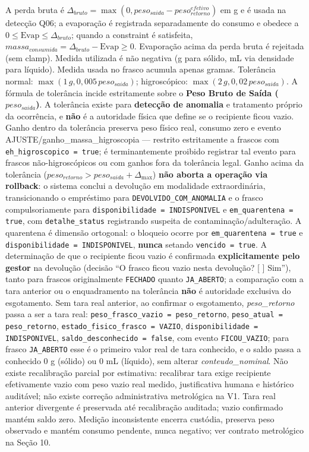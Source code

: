 \begin{regra}
A perda bruta é $\Delta_{bruto}=\max(0, peso_{saida}-peso_{retorno}^{efetivo})$ em g e é usada na detecção Q06; a evaporação é registrada separadamente do consumo e obedece a $0 \le \text{Evap} \le \Delta_{bruto}$; quando a constraint é satisfeita, $massa_{consumida}=\Delta_{bruto}-\text{Evap} \ge 0$. Evaporação acima da perda bruta é rejeitada (sem clamp). Medida utilizada é não negativa (g para sólido, mL via densidade para líquido). Medida usada no frasco acumula apenas gramas. Tolerância normal: $\max(1\,g,0{,}005\,peso_{saida})$; higroscópico: $\max(2\,g,0{,}02\,peso_{saida})$. A fórmula de tolerância incide estritamente sobre o \textbf{Peso Bruto de Saída ($peso_{saida}$)}. A tolerância existe para \textbf{detecção de anomalia} e tratamento próprio da ocorrência, e \textbf{não} é a autoridade física que define se o recipiente ficou vazio. Ganho dentro da tolerância preserva peso físico real, consumo zero e evento AJUSTE/ganho\_massa\_higroscopia --- restrito estritamente a frascos com \texttt{eh\_higroscopico = true}; é terminantemente proibido registrar tal evento para frascos não-higroscópicos ou com ganhos fora da tolerância legal. Ganho acima da tolerância ($peso_{retorno} > peso_{saida} + \Delta_{\max}$) \textbf{não aborta a operação via rollback}: o sistema conclui a devolução em modalidade extraordinária, transicionando o empréstimo para \texttt{DEVOLVIDO\_COM\_ANOMALIA} e o frasco compulsoriamente para \texttt{disponibilidade = INDISPONIVEL} e \texttt{em\_quarentena = true}, com \texttt{detalhe\_status} registrando suspeita de contaminação/adulteração. A quarentena é dimensão ortogonal: o bloqueio ocorre por \texttt{em\_quarentena = true} e \texttt{disponibilidade = INDISPONIVEL}, \textbf{nunca} setando \texttt{vencido = true}. A determinação de que o recipiente ficou vazio é confirmada \textbf{explicitamente pelo gestor} na devolução (decisão ``O frasco ficou vazio nesta devolução? [ ] Sim''), tanto para frascos originalmente \texttt{FECHADO} quanto \texttt{JA\_ABERTO}; a comparação com a tara anterior ou o enquadramento na tolerância \textbf{não} é autoridade exclusiva do esgotamento. Sem tara real anterior, ao confirmar o esgotamento, \textit{peso\_retorno} passa a ser a tara real: \texttt{peso\_frasco\_vazio = peso\_retorno}, \texttt{peso\_atual = peso\_retorno}, \texttt{estado\_fisico\_frasco = VAZIO}, \texttt{disponibilidade = INDISPONIVEL}, \texttt{saldo\_desconhecido = false}, com evento \texttt{FICOU\_VAZIO}; para frasco \texttt{JA\_ABERTO} esse é o primeiro valor real de tara conhecido, e o saldo passa a conhecido 0 g (sólido) ou 0 mL (líquido), sem alterar \textit{conteudo\_nominal}. Não existe recalibração parcial por estimativa: recalibrar tara exige recipiente efetivamente vazio com peso vazio real medido, justificativa humana e histórico auditável; não existe correção administrativa metrológica na V1. Tara real anterior divergente é preservada até recalibração auditada; vazio confirmado mantém saldo zero. Medição inconsistente encerra custódia, preserva peso observado e mantém consumo pendente, nunca negativo; ver contrato metrológico na Seção 10.
\end{regra}
